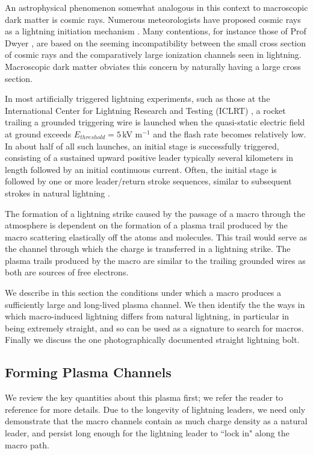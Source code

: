 \documentclass[%
 reprint,
 amsmath,amssymb,
 aps,
]{revtex4-2}
\begin{document}
    An astrophysical phenomenon somewhat analogous in this context to macroscopic dark matter is cosmic rays. Numerous meteorologists have proposed cosmic rays as a lightning initiation mechanism \citep{Babich2012}. Many contentions, for instance those of Prof Dwyer \citep{scientific_american_2008}, are based on the seeming incompatibility between the small cross section of cosmic rays and the comparatively large ionization channels seen in lightning. Macroscopic dark matter obviates this concern by naturally having a large cross section.

    In most artificially triggered lightning experiments, such as those at the International Center for Lightning Research and Testing (ICLRT) \citep{Hill2012, Hill2013}, a rocket trailing a grounded triggering wire is launched when the quasi-static electric field at ground exceeds $E_{threshold} = 5\,$kV m$^{-1}$ and the flash rate becomes relatively low. In about half of all such launches, an initial stage is successfully triggered, consisting of a sustained upward positive leader typically several kilometers in length followed by an initial continuous current. Often, the initial stage is followed by one or more leader/return stroke sequences, similar to subsequent strokes in natural lightning \citep{Wang1999, rocket2012}. 

    The formation of a lightning strike caused by the passage of a macro through the atmosphere is dependent on the formation of a plasma trail produced by the macro scattering elastically off the atoms and molecules. This trail would serve as the channel through which the charge is transferred in a lightning strike. The plasma trails produced by the macro are similar to the trailing grounded wires as both are sources of free electrons.  

    We describe in this section the conditions under which a macro produces a sufficiently large and long-lived plasma channel.  We then identify the the ways in which macro-induced lightning differs from natural lightning, in particular in being extremely straight, and so can be used as a signature to search for macros.  Finally we discuss the one photographically documented straight lightning bolt.

    \subsection{Forming Plasma Channels} %
    \label{sub:macro_induced_plasma_channels}

        We review the key quantities about this plasma first; we refer the reader to reference \citep{Sidhu2018auv} for more details.  Due to the longevity of lightning leaders, we need only demonstrate that the macro channels contain as much charge density as a natural leader, and persist long enough for the lightning leader to ``lock in" along the macro path. 
\end{document}
